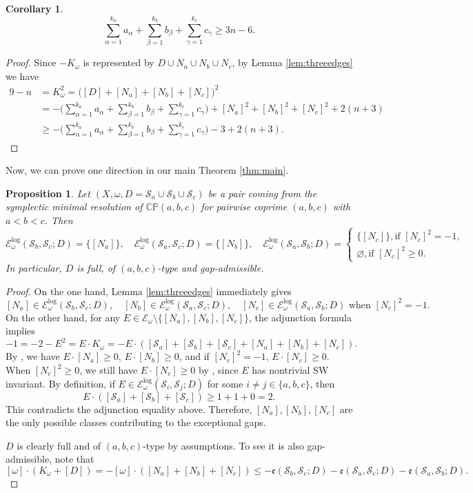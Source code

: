 \documentclass[11pt]{article}
\newtheorem{proposition}[theorem]{Proposition}
\newtheorem{corollary}[theorem]{Corollary}
\theoremstyle{definition}
\theoremstyle{remark}
\newcommand{\CP}{\mathbb{CP}}
\newcommand{\st}{\mathcal{S}}
\newcommand{\e}{\mathfrak{e}}
\begin{document}
\begin{corollary}\label{cor:3nminus6}
  \[\sum_{\alpha=1}^{k_a} a_\alpha+\sum_{\beta=1}^{k_b} b_{\beta}+\sum_{\gamma=1}^{k_c} c_{\gamma}\geq 3n-6.\]
\end{corollary}
\begin{proof}
  Since $-K_{\omega}$ is represented by $D\cup N_a\cup N_b\cup N_c$, by Lemma \ref{lem:threeedges} we have
   \begin{align*}
  9-n&=K_\omega^2=\big([D]+[N_a]+[N_b]+[N_c]\big)^2\\
  &=-\big(\sum_{\alpha=1}^{k_a} a_\alpha+\sum_{\beta=1}^{k_b} b_{\beta}+\sum_{\gamma=1}^{k_c} c_{\gamma}\big)+[N_a]^2+[N_b]^2+[N_c]^2+2(n+3)\\
  &\geq -\big(\sum_{\alpha=1}^{k_a} a_\alpha+\sum_{\beta=1}^{k_b} b_{\beta}+\sum_{\gamma=1}^{k_c} c_{\gamma}\big)-3+2(n+3).
  \end{align*}
\end{proof}

Now, we can prove one direction in our main Theorem \ref{thm:main}.
\begin{proposition}\label{prop:onlyif}
  Let $(X,\omega,D=\st_a\cup\st_b\cup\st_c)$ be a pair coming from the symplectic minimal resolution of $\CP(a,b,c)$ for pairwise coprime $(a,b,c)$ with $a<b<c$. Then 
\[\mathcal{E}^{\text{log}}_{\omega}(\st_b,\st_c;D)=\{[N_a]\},\quad \mathcal{E}^{\text{log}}_{\omega}(\st_a,\st_c;D)=\{[N_b]\},\quad \mathcal{E}^{\text{log}}_{\omega}(\st_a,\st_b;D)=\begin{cases}\{[N_c]\},\text{if } [N_c]^2=-1,\\
\varnothing ,\text{if } [N_c]^2\geq 0.\end{cases}\]
In particular, $D$ is full, of $(a,b,c)$-type and gap-admissible.
\end{proposition}

\begin{proof}
On the one hand, Lemma \ref{lem:threeedges} immediately gives
\[
  [N_a]\in \mathcal{E}^{\text{log}}_{\omega}(\st_b,\st_c;D),\quad [N_b]\in \mathcal{E}^{\text{log}}_{\omega}(\st_a,\st_c;D),\quad [N_c]\in\mathcal{E}^{\text{log}}_{\omega}(\st_a,\st_b;D)\text{ when } [N_c]^2=-1.
\]
On the other hand, for any
$E\in\mathcal{E}_\omega\setminus \{[N_a],[N_b],[N_c]\}$,
the adjunction formula implies
\[-1=-2-E^2=E\cdot K_\omega=-E\cdot ([\st_a]+[\st_b]+[\st_c]+[N_a]+[N_b]+[N_c]).\]  
By \cite[Lemma 2.1]{Pinsonnault}, we have $E\cdot [N_a]\geq 0$, $E\cdot[N_b]\geq 0$, and if $[N_c]^2=-1$, $E\cdot [N_c]\geq 0$.
When $[N_c]^2\geq 0$, we still have $E\cdot [N_c]\geq 0$ by \cite[Lemma 2.2]{Zhangcurvecone}, since $E$ has nontrivial SW invariant.
By definition, if $E\in \mathcal{E}^{\text{log}}_\omega(\st_i,\st_j;D)$ for some $i\neq j\in\{a,b,c\}$, then
\[
  E\cdot([\st_a]+[\st_b]+[\st_c])\geq 1+1+0= 2.
\]
This contradicts the adjunction equality above. Therefore, $[N_a],[N_b],[N_c]$ are the only possible classes contributing to the exceptional gaps.


$D$ is clearly full and of $(a,b,c)$-type by assumptions. To see it is also gap-admissible, note that 
\[[\omega]\cdot(K_\omega+[D])=-[\omega]\cdot ([N_a]+[N_b]+[N_c])\leq -\e(\st_b,\st_c;D)-\e(\st_a,\st_c;D)-\e(\st_a,\st_b;D).\]
\end{proof}
\end{document}
